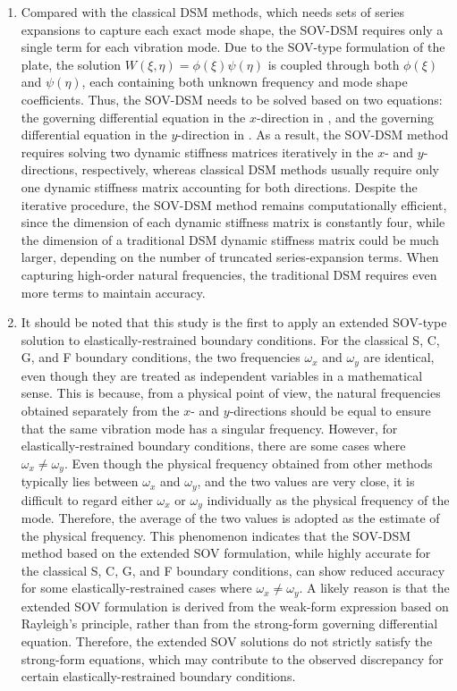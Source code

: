 \documentclass[preprint,12pt,number]{elsarticle}
\begin{document}
\begin{enumerate}[label=(\roman*)]
	\item Compared with the classical DSM methods, which needs sets of series expansions to capture each exact mode shape, the SOV-DSM requires only a single term for each vibration mode.
	Due to the SOV-type formulation of the plate, the solution $W(\xi,\eta) = \phi(\xi)\psi(\eta)$ is coupled through both $\phi(\xi)$ and $\psi(\eta)$, each containing both unknown frequency and mode shape coefficients.
	Thus, the SOV-DSM needs to be solved based on two equations: the governing differential equation in the $x$-direction in , and the governing differential equation in the $y$-direction in .
	As a result, the SOV-DSM method requires solving two dynamic stiffness matrices iteratively in the $x$- and $y$-directions, respectively, whereas classical DSM methods usually require only one dynamic stiffness matrix accounting for both directions.
	Despite the iterative procedure, the SOV-DSM method remains computationally efficient, since the dimension of each dynamic stiffness matrix is constantly four, while the dimension of a traditional DSM dynamic stiffness matrix could be much larger, depending on the number of truncated series-expansion terms.
	When capturing high-order natural frequencies, the traditional DSM requires even more terms to maintain accuracy.
	
	
	\item It should be noted that this study is the first to apply an extended SOV-type solution to elastically-restrained boundary conditions. 
	For the classical S, C, G, and F boundary conditions, the two frequencies $\omega_x$ and $\omega_y$ are identical, even though they are treated as independent variables in a mathematical sense. 
	This is because, from a physical point of view, the natural frequencies obtained separately from the $x$- and $y$-directions should be equal to ensure that the same vibration mode has a singular frequency. 
	However, for elastically-restrained boundary conditions, there are some cases where $\omega_x \neq \omega_y$. 
	Even though the physical frequency obtained from other methods typically lies between $\omega_x$ and $\omega_y$, and the two values are very close, it is difficult to regard either $\omega_x$ or $\omega_y$ individually as the physical frequency of the mode. 
	Therefore, the average of the two values is adopted as the estimate of the physical frequency.
	This phenomenon indicates that the SOV-DSM method based on the extended SOV formulation, while highly accurate for the classical S, C, G, and F boundary conditions, can show reduced accuracy for some elastically-restrained cases where $\omega_x \neq \omega_y$.
	A likely reason is that the extended SOV formulation is derived from the weak-form expression based on Rayleigh’s principle, rather than from the strong-form governing differential equation. 
	Therefore, the extended SOV solutions do not strictly satisfy the strong-form equations, which may contribute to the observed discrepancy for certain elastically-restrained boundary conditions.
		
\end{enumerate}
\end{document}
